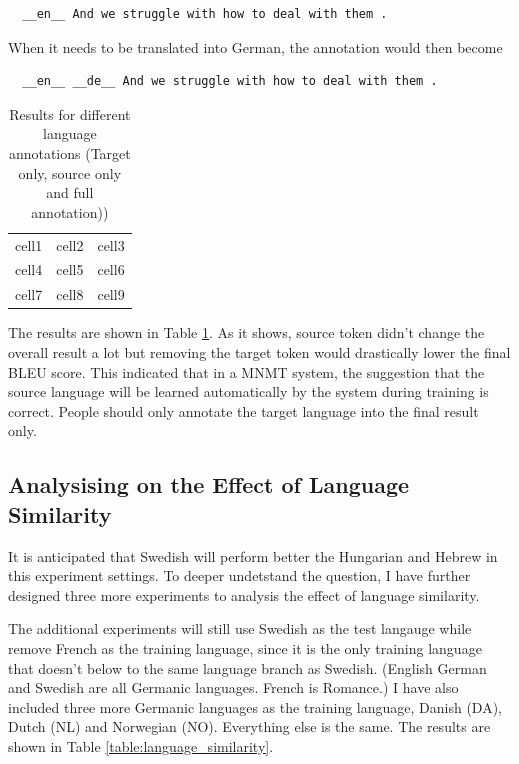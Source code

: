 \documentclass[thesis,fonts=libertine]{cluu}
\begin{document}
\begin{verbatim}
  __en__ And we struggle with how to deal with them .
\end{verbatim}

When it needs to be translated into German, the annotation would then become 

\begin{verbatim}
  __en__ __de__ And we struggle with how to deal with them .
\end{verbatim}

\begin{table}
  \centering
  \begin{tabular}{c c c}
    cell1 & cell2 & cell3 \\ 
    cell4 & cell5 & cell6 \\  
    cell7 & cell8 & cell9 
  \end{tabular}
  \caption{Results for different language annotations (Target only, source only and full annotation))}
  \label{table:altering_lang_id}
\end{table}

The results are shown in Table \ref{table:altering_lang_id}. As it shows, source token didn't change the overall result a lot but removing the target token would drastically lower the final BLEU score. This indicated that in a MNMT system, the suggestion that the source language will be learned automatically by the system during training is correct. People should only annotate the target language into the final result only.

\subsection{Analysising on the Effect of Language Similarity}

It is anticipated that Swedish will perform better the Hungarian and Hebrew in this experiment settings. To deeper undetstand the question, I have further designed three more experiments to analysis the effect of language similarity.

The additional experiments will still use Swedish as the test langauge while remove French as the training language, since it is the only training language that doesn't below to the same language branch as Swedish. (English German and Swedish are all Germanic languages. French is Romance.) I have also included three more Germanic languages as the training language, Danish (DA), Dutch (NL) and Norwegian (NO). Everything else is the same. The results are shown in Table \ref{table:language_similarity}.
\end{document}
